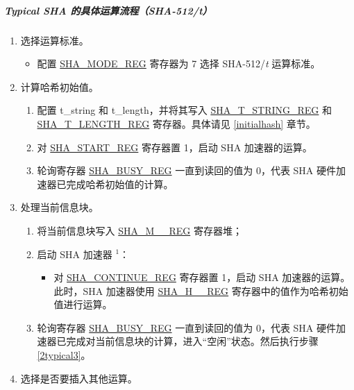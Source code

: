 \documentclass[main\_\_CN.tex]{subfiles}
\begin{document}
\subparagraph{Typical SHA 的具体运算流程（SHA-512/{\it{t}}）}
\begin{enumerate}
    \item 选择运算标准。\label{2typical1}
        \begin{itemize}
            \item 配置 \hyperref[regdesc:SHAMODEREG]{SHA\_MODE\_REG} 寄存器为 7 选择 SHA-512/{\it{t}} 运算标准。
        \end{itemize}
    \item 计算哈希初始值。
        \begin{enumerate}
        \item 配置 t\_string 和 t\_length，并将其写入 \hyperref[regdesc:SHATSTRINGREG]{SHA\_T\_STRING\_REG} 和 \hyperref[regdesc:SHATLENGTHREG]{SHA\_T\_LENGTH\_REG} 寄存器。具体请见 \ref{initialhash} 章节。
        \item 对 \hyperref[regdesc:SHASTARTREG]{SHA\_START\_REG} 寄存器置 1，启动 SHA 加速器的运算。
        \item 轮询寄存器 \hyperref[regdesc:SHABUSYREG]{SHA\_BUSY\_REG} 一直到读回的值为 0，代表 SHA 硬件加速器已完成哈希初始值的计算。
    \end{enumerate}
    \item 处理当前信息块\label{2typical2}。
        \begin{enumerate}
            \item 将当前信息块写入 \hyperref[regdesc:SHAMNREG]{SHA\_M\_\_REG} 寄存器堆；
            \item 启动 SHA 加速器 \hyperref[note1]{$^1$}：
            \begin{itemize}
            \item 对 \hyperref[regdesc:SHACONTINUEREG]{SHA\_CONTINUE\_REG} 寄存器置 1，启动 SHA 加速器的运算。此时，SHA 加速器使用 \hyperref[regdesc:SHAHNREG]{SHA\_H\_\_REG} 寄存器中的值作为哈希初始值进行运算。
            \end{itemize}
            \item 轮询寄存器 \hyperref[regdesc:SHABUSYREG]{SHA\_BUSY\_REG} 一直到读回的值为 0，代表 SHA 硬件加速器已完成对当前信息块的计算，进入“空闲”状态。然后执行步骤 \ref{2typical3}。
        \end{enumerate}
    \item \label{2typical3} 选择是否要插入其他运算。
        \begin{itemize}

\end{itemize}
\end{enumerate}
\end{document}

